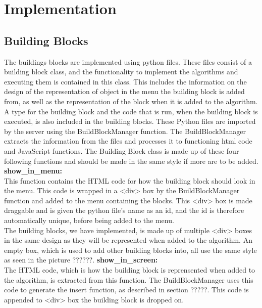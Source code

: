 \documentclass[11pt]{article}
\begin{document}
\newpage
\section{Implementation}

\subsection{Building Blocks}

The buildings blocks are implemented using python files. These files consist of a building block class, and the functionality to implement the algorithms and executing them is contained in this class. This includes the information on the design of the representation of object in the menu the building block is added from, as well as the representation of the block when it is added to the algorithm. A type for the building block and the code that is run, when the building block is executed, is also included in the building blocks.
These Python files are imported by the server using the BuildBlockManager function. The BuildBlockManager extracts the information from the files and processes it to functioning html code and JavaScript functions. 
The Building Block class is made up of these four following functions and should be made in the same style if more are to be added.\\
\textbf{show\_in\_menu:}\\
This function contains the HTML code for how the building block should look in the menu. This code is wrapped in a <div> box by the BuildBlockManager function and added to the menu containing the blocks. This <div> box is made draggable and is given the python file's name as an id, and the id is therefore automatically unique, before being added to the menu.\\
The building blocks, we have implemented, is made up of multiple <div> boxes in the same design as they will be represented when added to the algorithm. An empty box, which is used to add other building blocks into, all use the same style as seen in the picture ??????. %
\textbf{show\_in\_screen:}\\
The HTML code, which is how the building block is reprensented when added to the algorithm, is extracted from this function. The BuildBlockManager uses this code to generate the insert function, as described in section ?????. This code is appended to <div> box the building block is dropped on.\\
\end{document}
